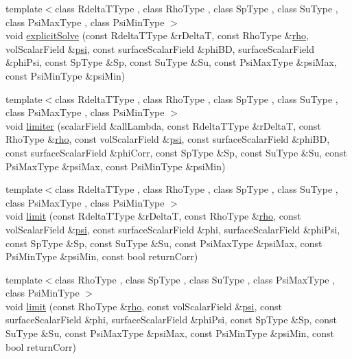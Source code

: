 \begin{DoxyCompactItemize}
\item 
{\footnotesize template$<$class Rdelta\+T\+Type , class Rho\+Type , class Sp\+Type , class Su\+Type , class Psi\+Max\+Type , class Psi\+Min\+Type $>$ }\\void \hyperlink{namespaceFoam_1_1myMULES_a87e110eac112b2759f9381066e701513}{explicit\+Solve} (const Rdelta\+T\+Type \&r\+DeltaT, const Rho\+Type \&\hyperlink{EEqn__1pl_8H_ac955f87ac2b79f02f420cae087fc52b1}{rho}, vol\+Scalar\+Field \&\hyperlink{UEqn__1pl_8H_a165a34deec3ee505598e511a88831968}{psi}, const surface\+Scalar\+Field \&phi\+BD, surface\+Scalar\+Field \&phi\+Psi, const Sp\+Type \&Sp, const Su\+Type \&Su, const Psi\+Max\+Type \&psi\+Max, const Psi\+Min\+Type \&psi\+Min)
\item 
{\footnotesize template$<$class Rdelta\+T\+Type , class Rho\+Type , class Sp\+Type , class Su\+Type , class Psi\+Max\+Type , class Psi\+Min\+Type $>$ }\\void \hyperlink{namespaceFoam_1_1myMULES_a8db4bd63b51f07fbea4b4d8a129868ac}{limiter} (scalar\+Field \&all\+Lambda, const Rdelta\+T\+Type \&r\+DeltaT, const Rho\+Type \&\hyperlink{EEqn__1pl_8H_ac955f87ac2b79f02f420cae087fc52b1}{rho}, const vol\+Scalar\+Field \&\hyperlink{UEqn__1pl_8H_a165a34deec3ee505598e511a88831968}{psi}, const surface\+Scalar\+Field \&phi\+BD, const surface\+Scalar\+Field \&phi\+Corr, const Sp\+Type \&Sp, const Su\+Type \&Su, const Psi\+Max\+Type \&psi\+Max, const Psi\+Min\+Type \&psi\+Min)
\item 
{\footnotesize template$<$class Rdelta\+T\+Type , class Rho\+Type , class Sp\+Type , class Su\+Type , class Psi\+Max\+Type , class Psi\+Min\+Type $>$ }\\void \hyperlink{namespaceFoam_1_1myMULES_a71d1731d21977db75d5f9bf2e880775f}{limit} (const Rdelta\+T\+Type \&r\+DeltaT, const Rho\+Type \&\hyperlink{EEqn__1pl_8H_ac955f87ac2b79f02f420cae087fc52b1}{rho}, const vol\+Scalar\+Field \&\hyperlink{UEqn__1pl_8H_a165a34deec3ee505598e511a88831968}{psi}, const surface\+Scalar\+Field \&phi, surface\+Scalar\+Field \&phi\+Psi, const Sp\+Type \&Sp, const Su\+Type \&Su, const Psi\+Max\+Type \&psi\+Max, const Psi\+Min\+Type \&psi\+Min, const bool return\+Corr)
\item 
{\footnotesize template$<$class Rho\+Type , class Sp\+Type , class Su\+Type , class Psi\+Max\+Type , class Psi\+Min\+Type $>$ }\\void \hyperlink{namespaceFoam_1_1myMULES_a6a4ca7f89dcf27e552f89e4a73d5a57c}{limit} (const Rho\+Type \&\hyperlink{EEqn__1pl_8H_ac955f87ac2b79f02f420cae087fc52b1}{rho}, const vol\+Scalar\+Field \&\hyperlink{UEqn__1pl_8H_a165a34deec3ee505598e511a88831968}{psi}, const surface\+Scalar\+Field \&phi, surface\+Scalar\+Field \&phi\+Psi, const Sp\+Type \&Sp, const Su\+Type \&Su, const Psi\+Max\+Type \&psi\+Max, const Psi\+Min\+Type \&psi\+Min, const bool return\+Corr)

\end{DoxyCompactItemize}
